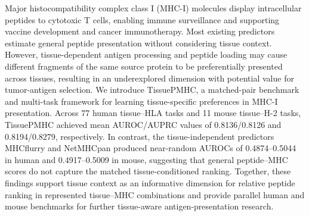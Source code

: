 Major histocompatibility complex class I (MHC-I) molecules display intracellular peptides to cytotoxic T cells, enabling immune surveillance and supporting vaccine development and cancer immunotherapy. Most existing predictors estimate general peptide presentation without considering tissue context. However, tissue-dependent antigen processing and peptide loading may cause different fragments of the same source protein to be preferentially presented across tissues, resulting in an underexplored dimension with potential value for tumor-antigen selection. We introduce TissuePMHC, a matched-pair benchmark and multi-task framework for learning tissue-specific preferences in MHC-I presentation. Across 77 human tissue--HLA tasks and 11 mouse tissue--H-2 tasks, TissuePMHC achieved mean AUROC/AUPRC values of 0.8136/0.8126 and 0.8194/0.8279, respectively. In contrast, the tissue-independent predictors MHCflurry and NetMHCpan produced near-random AUROCs of 0.4874--0.5044 in human and 0.4917--0.5009 in mouse, suggesting that general peptide--MHC scores do not capture the matched tissue-conditioned ranking. Together, these findings support tissue context as an informative dimension for relative peptide ranking in represented tissue--MHC combinations and provide parallel human and mouse benchmarks for further tissue-aware antigen-presentation research.